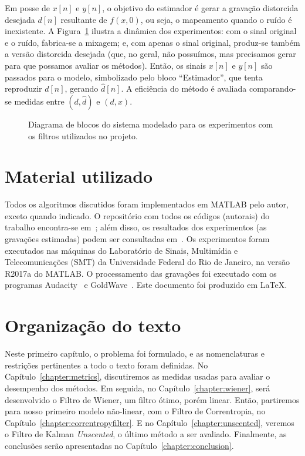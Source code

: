 Em posse de $x[n]$ e $y[n]$, o objetivo do estimador é gerar a gravação distorcida desejada $d[n]$ resultante de $f(x, 0)$, ou seja, o mapeamento quando o ruído é inexistente. A Figura~\ref{fig:intro:experiments-model} ilustra a dinâmica dos experimentos: com o sinal original e o ruído, fabrica-se a mixagem; e, com apenas o sinal original, produz-se também a versão distorcida desejada (que, no geral, não possuímos, mas precisamos gerar para que possamos avaliar os métodos). Então, os sinais $x[n]$ e $y[n]$ são passados para o modelo, simbolizado pelo bloco ``Estimador'', que tenta reproduzir $d[n]$, gerando $\hat{d}[n]$. A eficiência do método é avaliada comparando-se medidas entre $(d, \hat{d})$ e $(d, x)$.

\medskip
\begin{figure}[!ht]
    \centering
    
    \caption[Diagrama de blocos do sistema dos experimentos]{Diagrama de blocos do sistema modelado para os experimentos com os filtros utilizados no projeto.}
    \label{fig:intro:experiments-model}
\end{figure}

\section{Material utilizado}

Todos os algoritmos discutidos foram implementados em MATLAB pelo autor, exceto quando indicado. O repositório com todos os códigos (autorais) do trabalho encontra-se em~\cite{nonlinear-filters-repo}; além disso, os resultados dos experimentos (as gravações estimadas) podem ser consultadas em~\cite{nonlinear-results}. Os experimentos foram executados nas máquinas do Laboratório de Sinais, Multimídia e Telecomunicações (SMT) da Universidade Federal do Rio de Janeiro, na versão R2017a do MATLAB. O processamento das gravações foi executado com os programas Audacity~\cite{audacity} e GoldWave~\cite{goldwave}. Este documento foi produzido em \LaTeX.

\section{Organização do texto}

Neste primeiro capítulo, o problema foi formulado, e as nomenclaturas e restrições pertinentes a todo o texto foram definidas. No Capítulo~\ref{chapter:metrics}, discutiremos as medidas usadas para avaliar o desempenho dos métodos. Em seguida, no Capítulo~\ref{chapter:wiener}, será desenvolvido o Filtro de Wiener, um filtro ótimo, porém linear. Então, partiremos para nosso primeiro modelo não-linear, com o Filtro de Correntropia, no Capítulo~\ref{chapter:correntropyfilter}. E no Capítulo~\ref{chapter:unscented}, veremos o Filtro de Kalman \textit{Unscented}, o último método a ser avaliado. Finalmente, as conclusões serão apresentadas no Capítulo~\ref{chapter:conclusion}.